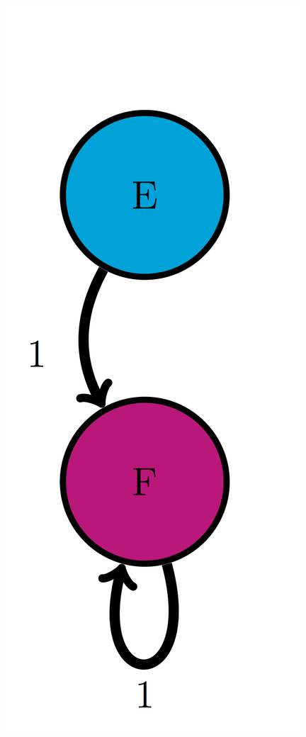 \documentclass[
]{book}
\theoremstyle{definition}
\theoremstyle{definition}
\theoremstyle{definition}
\theoremstyle{remark}
\begin{document}
\includegraphics{ch10/EF_trans_diag.png}
\end{document}
